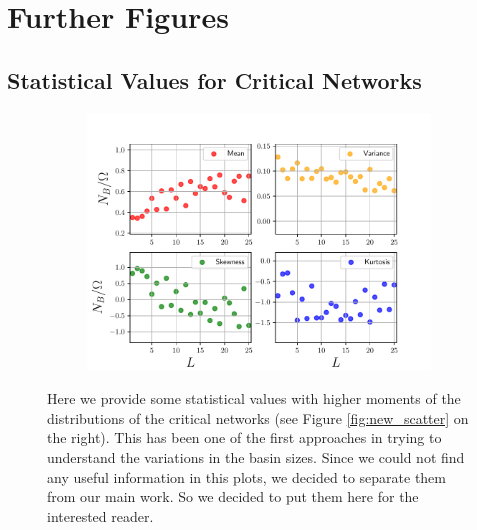 \paragraph*{}
\chapter{Further Figures}
\section{Statistical Values for Critical Networks}
\begin{figure}[h!]
	\centering
	\begin{subfigure}{\textwidth}
		\includegraphics[width=\textwidth]{Plots/mvsk_N10_K2}
	\end{subfigure}
	\caption{Here we provide some statistical values with higher moments of the distributions of the critical networks (see Figure \ref{fig:new_scatter} on the right). This has been one of the first approaches in trying to understand the variations in the basin sizes. Since we could not find any useful information in this plots, we decided to separate them from our main work. So we decided to put them here for the interested reader.}
	\label{fig:statistical_values}
	\par
\end{figure}
\newpage
